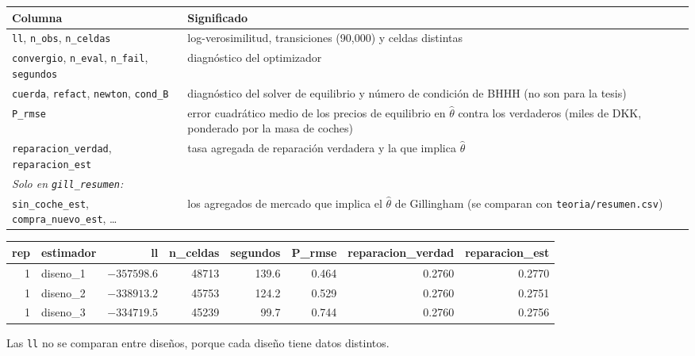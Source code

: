 \documentclass[11pt]{article}
\newcommand{\col}[1]{\texttt{#1}}
\begin{document}
\begin{center}\small
\begin{adjustbox}{max width=\textwidth}\begin{tabular}{p{4.2cm}p{10.6cm}}
\toprule
Columna & Significado\\
\midrule
\col{ll}, \col{n\_obs}, \col{n\_celdas} & log-verosimilitud, transiciones (90,000) y celdas distintas\\
\col{convergio}, \col{n\_eval}, \col{n\_fail}, \col{segundos} & diagnóstico del optimizador\\
\col{cuerda}, \col{refact}, \col{newton}, \col{cond\_B} & diagnóstico del solver de equilibrio y número de condición de BHHH (no son para la tesis)\\
\col{P\_rmse} & error cuadrático medio de los precios de equilibrio en $\hat\theta$ contra los verdaderos (miles de DKK, ponderado por la masa de coches)\\
\col{reparacion\_verdad}, \col{reparacion\_est} & tasa agregada de reparación verdadera y la que implica $\hat\theta$\\
\midrule
\multicolumn{2}{l}{\textit{Solo en \texttt{gill\_resumen}:}}\\
\col{sin\_coche\_est}, \col{compra\_nuevo\_est}, \dots & los agregados de mercado que implica el $\hat\theta$ de Gillingham (se comparan con \texttt{teoria/resumen.csv})\\
\bottomrule
\end{tabular}\end{adjustbox}
\end{center}

\begin{center}\footnotesize
\begin{adjustbox}{max width=\textwidth}\begin{tabular}{rlrrrrrr}
\toprule
rep & estimador & ll & n\_celdas & segundos & P\_rmse & reparacion\_verdad & reparacion\_est\\
\midrule
1 & diseno\_1 & $-357598.6$ & 48713 & 139.6 & 0.464 & 0.2760 & 0.2770\\
1 & diseno\_2 & $-338913.2$ & 45753 & 124.2 & 0.529 & 0.2760 & 0.2751\\
1 & diseno\_3 & $-334719.5$ & 45239 & 99.7 & 0.744 & 0.2760 & 0.2756\\
\bottomrule
\end{tabular}\end{adjustbox}
\end{center}
Las \col{ll} no se comparan entre diseños, porque cada diseño tiene datos distintos.
\end{document}
